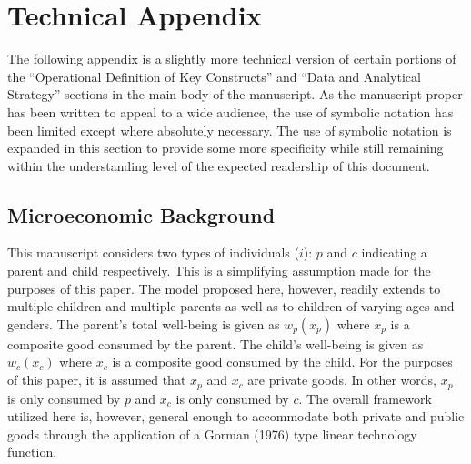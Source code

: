 \documentclass[]{elsarticle}
\begin{document}
\section{Technical Appendix}\label{technical-appendix}

The following appendix is a slightly more technical version of certain
portions of the ``Operational Definition of Key Constructs'' and ``Data
and Analytical Strategy'' sections in the main body of the manuscript.
As the manuscript proper has been written to appeal to a wide audience,
the use of symbolic notation has been limited except where absolutely
necessary. The use of symbolic notation is expanded in this section to
provide some more specificity while still remaining within the
understanding level of the expected readership of this document.

\subsection{Microeconomic Background}\label{microeconomic-background-1}

This manuscript considers two types of individuals ($i$): $p$ and $c$
indicating a parent and child respectively. This is a simplifying
assumption made for the purposes of this paper. The model proposed here,
however, readily extends to multiple children and multiple parents as
well as to children of varying ages and genders. The parent's total
well-being is given as $w_p(x_p)$ where $x_p$ is a composite good
consumed by the parent. The child's well-being is given as $w_c(x_c)$
where $x_c$ is a composite good consumed by the child. For the purposes
of this paper, it is assumed that $x_p$ and $x_c$ are private goods. In
other words, $x_p$ is only consumed by $p$ and $x_c$ is only consumed by
$c$. The overall framework utilized here is, however, general enough to
accommodate both private and public goods through the application of a
Gorman (1976) type linear technology function.
\end{document}
